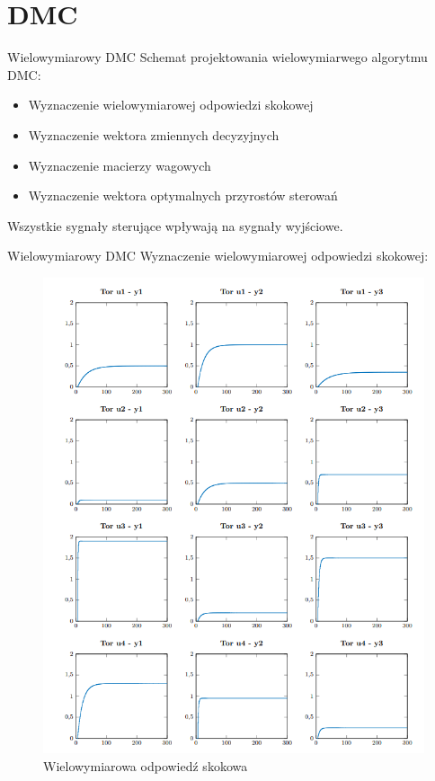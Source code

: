 \section{DMC}
\begin{frame}{Wielowymiarowy DMC}
Schemat projektowania wielowymiarwego algorytmu DMC:
\begin{itemize}
    \item Wyznaczenie wielowymiarowej odpowiedzi skokowej 
    \item Wyznaczenie wektora zmiennych decyzyjnych
    \item Wyznaczenie macierzy wagowych
    \item Wyznaczenie wektora optymalnych przyrostów sterowań
\end{itemize}
Wszystkie sygnały sterujące wpływają na sygnały wyjściowe. 
\end{frame}


\begin{frame}{Wielowymiarowy DMC}
Wyznaczenie wielowymiarowej odpowiedzi skokowej:
	\begin{center}
		\begin{figure}[H]
            		\includegraphics[scale=0.25]{images/PIDtory.png}
          			 \caption{Wielowymiarowa odpowiedź skokowa}
		\end{figure}
	\end{center}
\end{frame}

